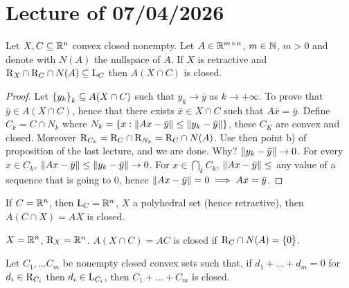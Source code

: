 \chapter{Lecture \thechapter{} of 07/04/2026}

\begin{proposition}[Book 1.4.13]
    
    Let $X,C \subseteq {\mathbb{R}^n}$ convex closed nonempty. Let $A \in \mathbb{R}^{m \times n}$, $m \in \mathbb{N}$, $m > 0$ and denote with $N(A)$ the nullspace of $A$. If $X$ is retractive and $\mathrm{R}_{X} \cap \mathrm{R}_{C} \cap N(A) \subseteq \mathrm{L}_{C}$ then $A(X \cap C)$ is closed.

\end{proposition}

\begin{proof}
    
        Let $\left\{ y_k \right\}_k \subseteq A(X \cap C)$ such that $y_k \to \bar{y}$ as $k \to +\infty$. To prove that $\bar{y} \in A(X \cap C)$, hence that there exists $\bar{x} \in X \cap C$ such that $A\bar{x} = \bar{y}$. Define $C_k = C \cap N_k$ where $N_k = \left\{ x : \lVert Ax - \bar{y} \rVert \le \lVert y_k - \bar{y} \rVert \right\}$, these $C_K$ are convex and closed. Moreover $\mathrm{R}_{C_k} = \mathrm{R}_{C} \cap \mathrm{R}_{N_k} = \mathrm{R}_{C} \cap N(A)$. Use then point b) of proposition of the last lecture, and we are done. Why? $\lVert y_k - \bar{y} \rVert \to 0$. For every $x \in C_k$, $\lVert Ax - \bar{y} \rVert \le \lVert y_k - \bar{y} \rVert \to 0$. For $x \in \bigcap_k C_k$, $\lVert Ax - \bar{y} \rVert\le$ any value of a sequence that is going to 0, hence $\lVert Ax - \bar{y} \rVert = 0 \implies Ax = \bar{y}$.

\end{proof}

\begin{remark}
    
    If $C = {\mathbb{R}^n}$, then $\mathrm{L}_{C} = {\mathbb{R}^n}$, $X$ a polyhedral set (hence retractive), then $A(C \cap X) = AX$ is closed.

\end{remark}

\begin{remark}
    
    $X = {\mathbb{R}^n}$, $\mathrm{R}_{X} = {\mathbb{R}^n}$. $A(X \cap C) = AC$ is closed if $\mathrm{R}_{C} \cap N(A) = \left\{ 0 \right\}$.

\end{remark}

\begin{proposition}
    
    Let $C_1,\dots C_m$ be nonempty closed convex sets such that, if $d_1 + \dots + d_m = 0$ for $d_i \in \mathrm{R}_{C_i}$ then $d_i \in \mathrm{L}_{C_i}$, then $C_1 +\dots +C_m$ is closed.

\end{proposition}


